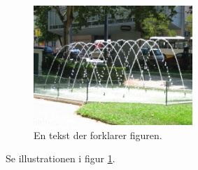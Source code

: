 \documentclass{article}
\begin{document}
\begin{figure}
\centering
\includegraphics[width=6cm]{vandstraaler.jpg}
\caption{En tekst der forklarer figuren.}
\label{figImage}
\end{figure}

Se illustrationen i figur \ref{figImage}.
\end{document}
